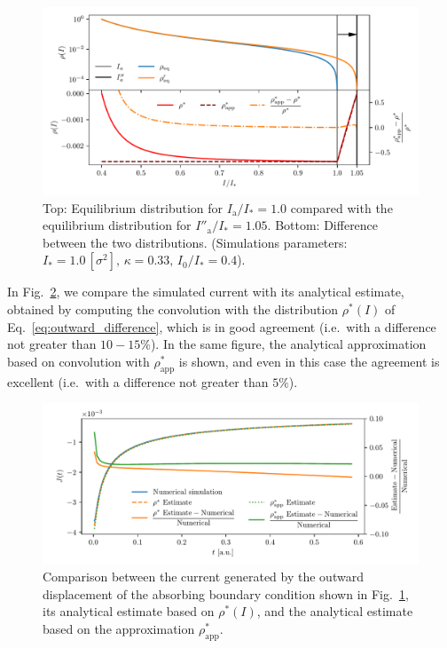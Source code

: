 {\begin{figure}[t]
    \centering
    \includegraphics[width=\textwidth]{4_probing_the_diffusive_behavior/figs/final/difference_outwards_s.pdf}
    \caption{Top: Equilibrium distribution for $I_\mathrm{a}/I_\ast = 1.0$ compared with the equilibrium distribution for $I''_\mathrm{a}/I_\ast = 1.05$. Bottom: Difference between the two distributions. (Simulations parameters: $I_\ast = 1.0\,[\sigma^2],\, \kappa = 0.33,\, I_0/I_\ast = 0.4$).}
    \label{fig:6}
\end{figure}

In Fig.~\ref{fig:7}, we compare the simulated current with its analytical estimate, obtained by computing the convolution with the distribution $\rho^\ast(I)$ of Eq.~\eqref{eq:outward_difference}, which is in good agreement {(i.e.\ with a difference not greater than $10-15\%$)}. In the same figure, the analytical approximation based on convolution with $\rho^\ast_\text{app}$ is shown, and even in this case the agreement is excellent {(i.e.\ with a difference not greater than $5\%$)}.

\begin{figure}[t]
    \centering
    \includegraphics[width=\textwidth]{4_probing_the_diffusive_behavior/figs/final/current_outwards.pdf}
    \caption{Comparison between the current generated by the outward displacement of the absorbing boundary condition shown in Fig.~\ref{fig:6}, its analytical estimate based on $\rho^\ast(I)$, and the analytical estimate based on the approximation $\rho^\ast_\text{app}$.}
    \label{fig:7}
\end{figure}

}
